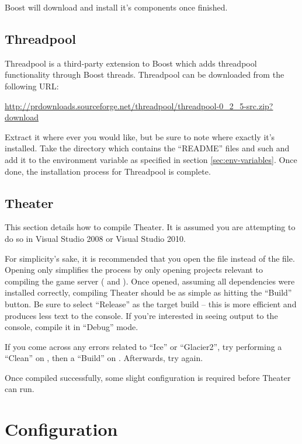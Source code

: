 Boost will download and install it's components once finished.

\subsection{Threadpool}

Threadpool is a third-party extension to Boost which adds threadpool functionality through Boost threads. Threadpool can be downloaded from the following URL:

\url{http://prdownloads.sourceforge.net/threadpool/threadpool-0_2_5-src.zip?download}

Extract it where ever you would like, but be sure to note where exactly it's installed. Take the directory which contains the ``README'' files and such and add it to the environment variable  as specified in section \ref{sec:env-variables}. Once done, the installation process for Threadpool is complete.

\subsection{Theater}

This section details how to compile Theater. It is assumed you are attempting to do so in Visual Studio 2008 or Visual Studio 2010.

For simplicity's sake, it is recommended that you open the  file instead of the  file. Opening only  simplifies the process by only opening projects relevant to compiling the game server ( and ). Once opened, assuming all dependencies were installed correctly, compiling Theater should be as simple as hitting the ``Build'' button. Be sure to select ``Release'' as the target build -- this is more efficient and produces less text to the console. If you're interested in seeing output to the console, compile it in ``Debug'' mode.

If you come across any errors related to ``Ice'' or ``Glacier2'', try performing a ``Clean'' on , then a ``Build'' on . Afterwards, try again.

Once compiled successfully, some slight configuration is required before Theater can run.

\section{Configuration}

